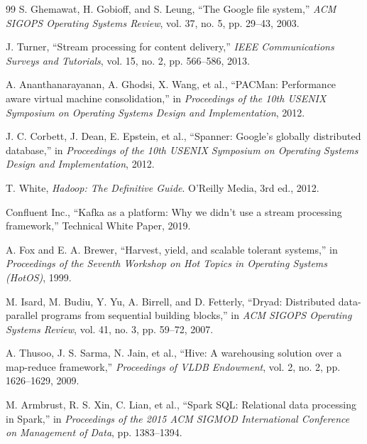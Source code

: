 \documentclass[10pt,twocolumn]{article}
\begin{document}
\begin{thebibliography}{99}
 S. Ghemawat, H. Gobioff, and S. Leung, ``The Google file system,'' \textit{ACM SIGOPS Operating Systems Review}, vol. 37, no. 5, pp. 29--43, 2003.

 J. Turner, ``Stream processing for content delivery,'' \textit{IEEE Communications Surveys and Tutorials}, vol. 15, no. 2, pp. 566--586, 2013.

 A. Ananthanarayanan, A. Ghodsi, X. Wang, et al., ``PACMan: Performance aware virtual machine consolidation,'' in \textit{Proceedings of the 10th USENIX Symposium on Operating Systems Design and Implementation}, 2012.

 J. C. Corbett, J. Dean, E. Epstein, et al., ``Spanner: Google's globally distributed database,'' in \textit{Proceedings of the 10th USENIX Symposium on Operating Systems Design and Implementation}, 2012.

 T. White, \textit{Hadoop: The Definitive Guide}. O'Reilly Media, 3rd ed., 2012.

 Confluent Inc., ``Kafka as a platform: Why we didn't use a stream processing framework,'' Technical White Paper, 2019.

 A. Fox and E. A. Brewer, ``Harvest, yield, and scalable tolerant systems,'' in \textit{Proceedings of the Seventh Workshop on Hot Topics in Operating Systems (HotOS)}, 1999.

 M. Isard, M. Budiu, Y. Yu, A. Birrell, and D. Fetterly, ``Dryad: Distributed data-parallel programs from sequential building blocks,'' in \textit{ACM SIGOPS Operating Systems Review}, vol. 41, no. 3, pp. 59--72, 2007.

 A. Thusoo, J. S. Sarma, N. Jain, et al., ``Hive: A warehousing solution over a map-reduce framework,'' \textit{Proceedings of VLDB Endowment}, vol. 2, no. 2, pp. 1626--1629, 2009.

 M. Armbrust, R. S. Xin, C. Lian, et al., ``Spark SQL: Relational data processing in Spark,'' in \textit{Proceedings of the 2015 ACM SIGMOD International Conference on Management of Data}, pp. 1383--1394.

\end{thebibliography}
\end{document}
